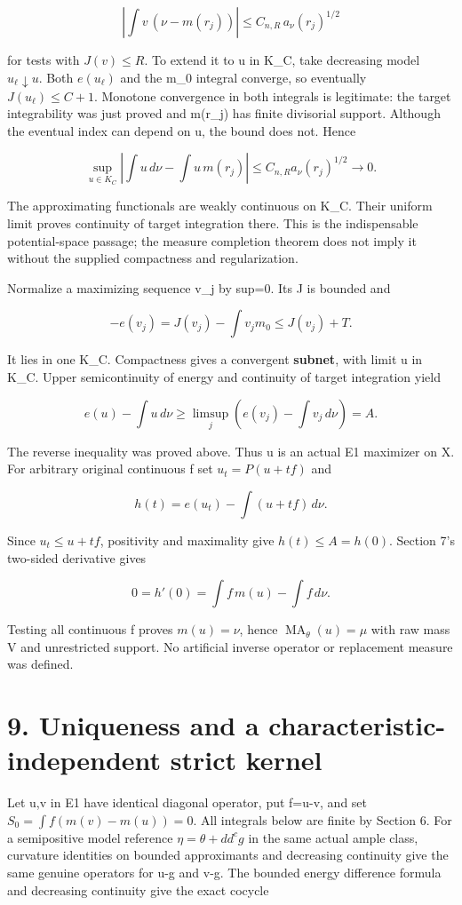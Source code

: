 \documentclass[11pt]{article}
\newcommand{\MA}{\operatorname{MA}}
\begin{document}
\[
\left|\int v\,(\nu-m(r_j))\right|
\leq C_{n,R}\,a_\nu(r_j)^{1/2}
\]

for tests with \(J(v)\leq R\). To extend it to u in K\_C, take decreasing model \(u_\ell\downarrow u\). Both \(e(u_\ell)\) and the m\_0 integral converge, so eventually \(J(u_\ell)\leq C+1\). Monotone convergence in both integrals is legitimate: the target integrability was just proved and m(r\_j) has finite divisorial support. Although the eventual index can depend on u, the bound does not. Hence

\[
\sup_{u\in K_C}\left|\int u\,d\nu-\int u\,m(r_j)\right|
\leq C_{n,R}a_\nu(r_j)^{1/2}\longrightarrow0.
\]

The approximating functionals are weakly continuous on K\_C. Their uniform limit proves continuity of target integration there. This is the indispensable potential-space passage; the measure completion theorem does not imply it without the supplied compactness and regularization.

Normalize a maximizing sequence v\_j by sup=0. Its J is bounded and

\[
-e(v_j)=J(v_j)-\int v_jm_0\leq J(v_j)+T.
\]

It lies in one K\_C. Compactness gives a convergent \textbf{subnet}, with limit u in K\_C. Upper semicontinuity of energy and continuity of target integration yield

\[
e(u)-\int u\,d\nu\geq\limsup_j\left(e(v_j)-\int v_j\,d\nu\right)=A.
\]

The reverse inequality was proved above. Thus u is an actual E1 maximizer on X. For arbitrary original continuous f set \(u_t=P(u+tf)\) and

\[
h(t)=e(u_t)-\int(u+tf)\,d\nu.
\]

Since \(u_t\leq u+tf\), positivity and maximality give \(h(t)\leq A=h(0)\). Section 7's two-sided derivative gives

\[
0=h'(0)=\int f\,m(u)-\int f\,d\nu.
\]

Testing all continuous f proves \(m(u)=\nu\), hence \(\MA_\theta(u)=\mu\) with raw mass V and unrestricted support. No artificial inverse operator or replacement measure was defined.

\section*{9. Uniqueness and a characteristic-independent strict kernel}

Let u,v in E1 have identical diagonal operator, put f=u-v, and set \(S_0=\int f(m(v)-m(u))=0\). All integrals below are finite by Section 6. For a semipositive model reference \(\eta=\theta+dd^cg\) in the same actual ample class, curvature identities on bounded approximants and decreasing continuity give the same genuine operators for u-g and v-g. The bounded energy difference formula and decreasing continuity give the exact cocycle
\end{document}
